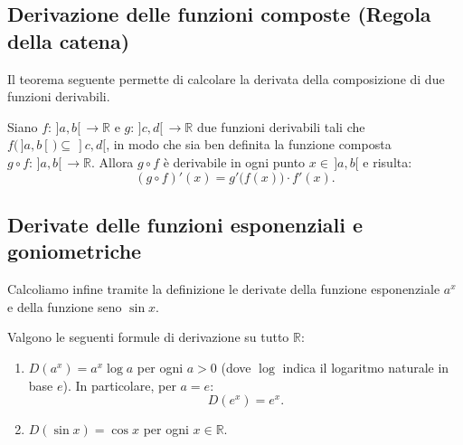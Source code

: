 \subsection{Derivazione delle funzioni composte (Regola della catena)}

Il teorema seguente permette di calcolare la derivata della composizione di due funzioni derivabili.

\begin{propbox}
Siano $f \colon \,]a,b[\, \to \mathbb{R}$ e $g \colon \,]c,d[\, \to \mathbb{R}$ due funzioni derivabili tali che $f\bigl(\,]a,b[\,\bigr) \subseteq \,]c,d[$, in modo che sia ben definita la funzione composta $g \circ f \colon \,]a,b[\, \to \mathbb{R}$. Allora $g \circ f$ è derivabile in ogni punto $x \in \,]a,b[$ e risulta:
\[
    (g \circ f)'(x) = g'\bigl(f(x)\bigr) \cdot f'(x).
\]
\end{propbox}

\subsection{Derivate delle funzioni esponenziali e goniometriche}

Calcoliamo infine tramite la definizione le derivate della funzione esponenziale $a^x$ e della funzione seno $\sin x$.

\begin{propbox}
Valgono le seguenti formule di derivazione su tutto $\mathbb{R}$:
\begin{enumerate}
    \item $D(a^x) = a^x \log a$ per ogni $a > 0$ (dove $\log$ indica il logaritmo naturale in base $e$). In particolare, per $a = e$:
    \[
        D(e^x) = e^x.
    \]
    \item $D(\sin x) = \cos x$ per ogni $x \in \mathbb{R}$.
\end{enumerate}
\end{propbox}


